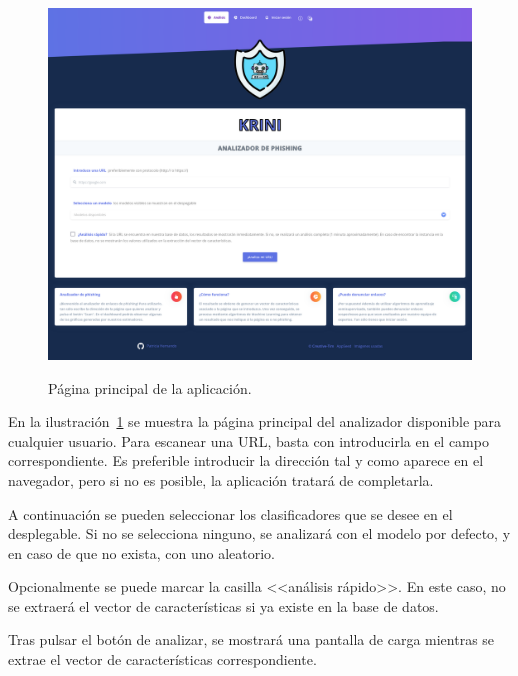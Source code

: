 \begin{figure}[h]
	\caption[Manual de usuario: página principal]{Página principal de la aplicación.}
	\centering
	\includegraphics[width=\textwidth]{../img/anexos/user_guide/1_index}
	\label{e-1:index}
\end{figure}

En la ilustración~\ref{e-1:index} se muestra la página principal del analizador disponible para cualquier usuario. Para escanear una URL, basta con introducirla en el campo correspondiente. Es preferible introducir la dirección tal y como aparece en el navegador, pero si no es posible, la aplicación tratará de completarla.

A continuación se pueden seleccionar los clasificadores que se desee en el desplegable. Si no se selecciona ninguno, se analizará con el modelo por defecto, y en caso de que no exista, con uno aleatorio.

Opcionalmente se puede marcar la casilla <<análisis rápido>>. En este caso, no se extraerá el vector de características si ya existe en la base de datos.

Tras pulsar el botón de analizar, se mostrará una pantalla de carga mientras se extrae el vector de características correspondiente.


